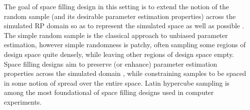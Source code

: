 %	
%

%
The goal of space filling design in this setting is to extend the notion of the 
random sample (and its desirable parameter estimation properties) across the 
simulated RP domain so as to represent the simulated space as well as possible .
The simple random sample is the classical approach to unbiased parameter 
estimation, however simple randomness is patchy, often sampling some regions 
of design space quite densely, while leaving other regions of design space empty. 
Space filling designs aim to preserve (or enhance) parameter estimation properties 
across the simulated domain , 
while constraining samples to be spaced in some notion of spread over the entire space.
Latin hypercube sampling  is among the most 
foundational of space filling designs used in computer experiments.

